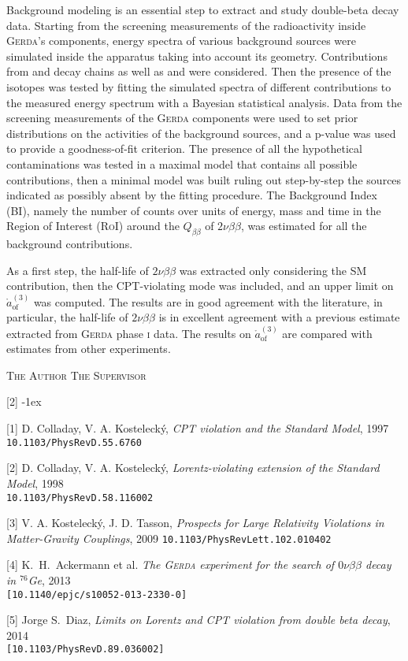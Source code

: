 \documentclass[11pt, a4paper]{article}
\newcommand{\aof}{\mathring{a}_\text{of}^{(3)}}
\begin{document}
Background modeling is an essential step to extract and study double-beta decay data. Starting from the screening measurements of the radioactivity inside \textsc{Gerda}'s components, energy spectra of various background sources were simulated inside the apparatus taking into account its geometry. Contributions from  and  decay chains as well as  and  were considered. Then the presence of the isotopes was tested by fitting the simulated spectra of different contributions to the measured energy spectrum with a Bayesian statistical analysis. Data from the screening measurements of the \textsc{Gerda} components were used to set prior distributions on the activities of the background sources, and a p-value was used to provide a goodness-of-fit criterion. The presence of all the hypothetical contaminations was tested in a maximal model that contains all possible contributions, then a minimal model was built ruling out step-by-step the sources indicated as possibly absent by the fitting procedure. The Background Index (BI), namely the number of counts over units of energy, mass and time in the Region of Interest (\textsc{RoI}) around the $Q_{\beta\beta}$ of $2\nu\beta\beta$, was estimated for all the background contributions.

As a first step, the half-life of $2\nu\beta\beta$ was extracted only considering the SM contribution, then the CPT-violating mode was included, and an upper limit on $\aof$ was computed. The results are in good agreement with the literature, in particular, the half-life of $2\nu\beta\beta$ is in excellent agreement with a previous estimate extracted from \textsc{Gerda} phase \textsc{i} data. The results on $\aof$ are compared with estimates from other experiments.
\vspace{2cm}
\begin{multicols}{2}
\noindent
\textsc{The Author}
\columnbreak
\flushright
\textsc{The Supervisor}
\end{multicols}
\vspace*{\fill}
\begin{labeling}{{[2]}}
\footnotesize
\itemsep-1ex
	\item[{[1]}] D. Colladay, V. A. Kosteleck\'y, \emph{CPT violation and the Standard Model}, 1997\\\texttt{10.1103/PhysRevD.55.6760}
	\item[{[2]}] D. Colladay, V. A. Kosteleck\'y, \emph{Lorentz-violating extension of the Standard Model}, 1998\\\texttt{10.1103/PhysRevD.58.116002}
	\item[{[3]}] V. A. Kosteleck\'y, J. D. Tasson, \emph{Prospects for Large Relativity Violations in Matter-Gravity Couplings}, 2009 \texttt{10.1103/PhysRevLett.102.010402}
	\item[{[4]}] K.~H.~Ackermann et al. \emph{The \textsc{Gerda} experiment for the search of $0\nu\beta\beta$ decay in $^{76}$Ge}, 2013\\\texttt{[10.1140/epjc/s10052-013-2330-0]}
	\item[{[5]}] Jorge S.~Diaz, \emph{Limits on Lorentz and CPT violation from double beta decay}, 2014\\\texttt{[10.1103/PhysRevD.89.036002]}
\end{labeling}
\end{document}
